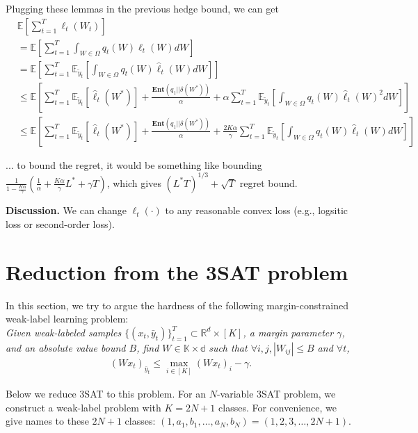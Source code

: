 \documentclass{article}
\newcommand{\field}[1]{\mathbb{#1}}
\newcommand{\E}{\field{E}}
\begin{document}
Plugging these lemmas in the previous hedge bound, we can get \begin{align*}
&\E\left[\sum_{t=1}^T  \ell_{t}(W_{t})  \right]\\
&=\E\left[\sum_{t=1}^T  \int_{W\in\Omega} q_t(W)\ell_t(W)dW  \right] \\
&=\E\left[\sum_{t=1}^T \E_{\tilde{y}_t} \left[ \int_{W\in\Omega} q_t(W)\hat{\ell}_t(W)dW \right] \right]\\
&\leq \E\left[\sum_{t=1}^T \E_{\tilde{y}_t} \left[ \hat{\ell}_t(W^*) \right]+ \frac{\textbf{Ent}(q_1||\delta(W^*))}{\alpha} + \alpha \sum_{t=1}^T \E_{\tilde{y}_t}\left[ \int_{W\in\Omega} q_t(W)\hat{\ell}_t(W)^2dW \right] \right] \\ 
&\leq \E\left[\sum_{t=1}^T \E_{\tilde{y}_t}\left[ \hat{\ell}_t(W^*) \right] + \frac{\textbf{Ent}(q_1||\delta(W^*))}{\alpha} + \frac{2K\alpha}{\gamma} \sum_{t=1}^T \E_{\tilde{y}_t}\left[ \int_{W\in\Omega} q_t(W)\hat{\ell}_t(W)dW \right]\right]
\end{align*}

... to bound the regret, it would be something like bounding $\frac{1}{1-\frac{K\alpha}{\gamma}}\left(\frac{1}{\alpha}+\frac{K\alpha}{\gamma}L^* + \gamma T\right)$, which gives $(L^*T)^{1/3} + \sqrt{T}$ regret bound. 


\textbf{Discussion.} We can change $\ell_t(\cdot)$ to any reasonable convex loss (e.g., logsitic loss or second-order loss). 

\iffalse
\section{Reduction from the 3SAT problem}
In this section, we try to argue the hardness of the following margin-constrained weak-label learning problem: 
\textit{
\ \\
Given weak-labeled samples $\{(x_t, \bar{y}_t)\}_{t=1}^T \subset \mathbb{R}^d \times [K]$, a margin parameter $\gamma$, and an absolute value bound $B$, find $W\in \mathbb{K\times d}$ such that $ \forall i,j, |W_{ij}|\leq B$ and $\forall t$,
\begin{align*}
(Wx_t)_{\bar{y}_t} \leq \max_{i\in [K]} (Wx_t)_i - \gamma. 
\end{align*}
}

Below we reduce 3SAT to this problem. For an $N$-variable 3SAT problem, we construct a weak-label problem with $K=2N+1$ classes. For convenience, we give names to these $2N+1$ classes: $(1, a_1, b_1, \ldots, a_N, b_N)=(1,2,3,\ldots, 2N+1)$. 
\end{document}
